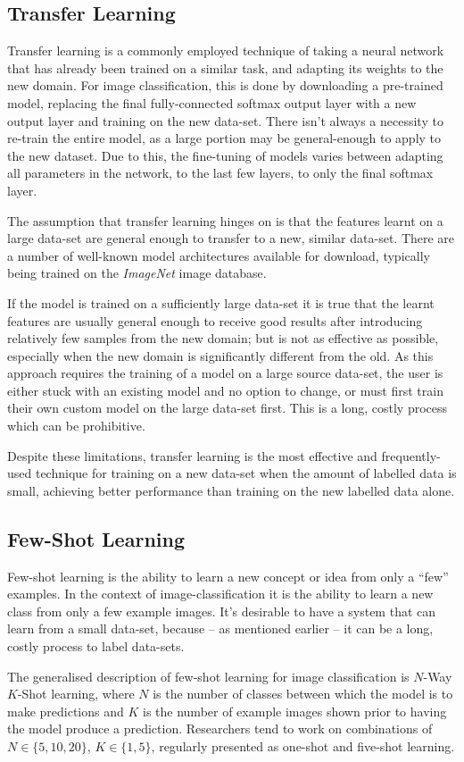 \documentclass{report}
\begin{document}
\subsection{Transfer Learning} \label{transfer-learning}
Transfer learning is a commonly employed technique of taking a neural network that has already been trained on a similar task, and adapting its weights to the new domain. For image classification, this is done by downloading a pre-trained model, replacing the final fully-connected softmax output layer with a new output layer and training on the new data-set. There isn't always a necessity to re-train the entire model, as a large portion may be general-enough to apply to the new dataset. Due to this, the fine-tuning of models varies between adapting all parameters in the network, to the last few layers, to only the final softmax layer.  \par
The assumption that transfer learning hinges on is that the features learnt on a large data-set are general enough to transfer to a new, similar data-set. There are a number of well-known model architectures available for download, typically being trained on the \textit{ImageNet} image database\parencite{ilsvr}. \par
If the model is trained on a sufficiently large data-set it is true that the learnt features are usually general enough to receive good results after introducing relatively few samples from the new domain; but is not as effective as possible, especially when the new domain is significantly different from the old. As this approach requires the training of a model on a large source data-set, the user is either stuck with an existing model and no option to change, or must first train their own custom model on the large data-set first. This is a long, costly process which can be prohibitive. \par
Despite these limitations, transfer learning is the most effective and frequently-used technique for training on a new data-set when the amount of labelled data is small, achieving better performance than training on the new labelled data alone. \par

\subsection{Few-Shot Learning}
Few-shot learning is the ability to learn a new concept or idea from only a ``few'' examples. In the context of image-classification it is the ability to learn a new class from only a few example images. It's desirable to have a system that can learn from a small data-set, because -- as mentioned earlier -- it can be a long, costly process to label data-sets. \par
The generalised description of few-shot learning for image classification is $N$-Way $K$-Shot learning, where $N$ is the number of classes between which the model is to make predictions and $K$ is the number of example images shown prior to having the model produce a prediction. Researchers tend to work on combinations of $N \in \{5, 10, 20\}$, $K \in \{1, 5\}$, regularly presented as one-shot and five-shot learning.
\end{document}
